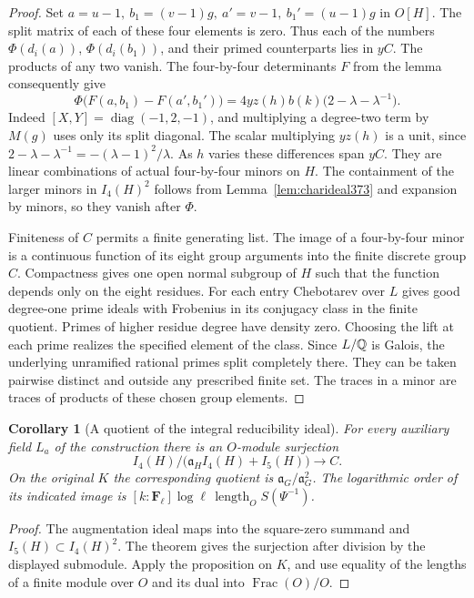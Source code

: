 \documentclass[a4paper,11pt]{article}
\newtheorem{corollary}[proposition]{Corollary}
\theoremstyle{definition}
\theoremstyle{remark}
\newcommand{\len}{\operatorname{length}}\newcommand{\Res}{\operatorname*{Res}}
\numberwithin{equation}{section}
\begin{document}
\begin{proof}
Set \(a=u-1,\ b_1=(v-1)g,\ a'=v-1,\ b_1'=(u-1)g\) in
\(O[H]\). The split matrix of each of these four elements
is zero. Thus each of the numbers \(\Phi(d_i(a))\),
\(\Phi(d_i(b_1))\), and their primed counterparts lies in
\(yC\). The products of any two vanish. The four-by-four
determinants \(F\) from the lemma consequently give
\[
 \Phi\bigl(F(a,b_1)-F(a',b_1')\bigr)
   =4yz(h)b(k)\bigl(2-\lambda-\lambda^{-1}\bigr).
\]
Indeed \([X,Y]=\operatorname{diag}(-1,2,-1)\), and multiplying
a degree-two term by \(M(g)\) uses only its split diagonal.
The scalar multiplying \(yz(h)\) is a unit, since
\(2-\lambda-\lambda^{-1}=-(\lambda-1)^2/\lambda\).
As \(h\) varies these differences span \(yC\). They are
linear combinations of actual four-by-four minors on \(H\).
The containment of the larger minors in \(I_4(H)^2\)
follows from Lemma~\ref{lem:charideal373} and expansion by
minors, so they vanish after \(\Phi\).

Finiteness of \(C\) permits a finite generating list. The
image of a four-by-four minor is a continuous function of
its eight group arguments into the finite discrete group
\(C\). Compactness gives one open normal subgroup of \(H\)
such that the function depends only on the eight residues.
For each entry Chebotarev over \(L\) gives good degree-one
prime ideals with Frobenius in its conjugacy class in the
finite quotient. Primes of higher residue degree have
density zero. Choosing the lift at each prime realizes
the specified element of the class. Since \(L/\mathbb Q\) is
Galois, the underlying unramified rational primes split
completely there. They can be taken pairwise distinct and
outside any prescribed finite set. The traces in a minor
are traces of products of these chosen group elements.
\end{proof}

\begin{corollary}[A quotient of the integral reducibility ideal]
\label{cor:minororder373}
For every auxiliary field \(L_a\) of the construction there
is an \(O\)-module surjection
\[
     I_4(H)/\bigl(\mathfrak a_H I_4(H)+I_5(H)\bigr)
                         \longrightarrow C .
\]
On the original \(K\) the corresponding quotient is
\(\mathfrak a_G/\mathfrak a_G^2\). The logarithmic order
of its indicated image is
\([k:\mathbf F_\ell]\log\ell\,\len_O S(\Psi^{-1})\).
\end{corollary}
\begin{proof}
The augmentation ideal maps into the square-zero summand
and \(I_5(H)\subset I_4(H)^2\). The theorem gives the
surjection after division by the displayed submodule.
Apply the proposition on \(K\), and use equality of the
lengths of a finite module over \(O\) and its dual into
\(\operatorname{Frac}(O)/O\).
\end{proof}
\end{document}
